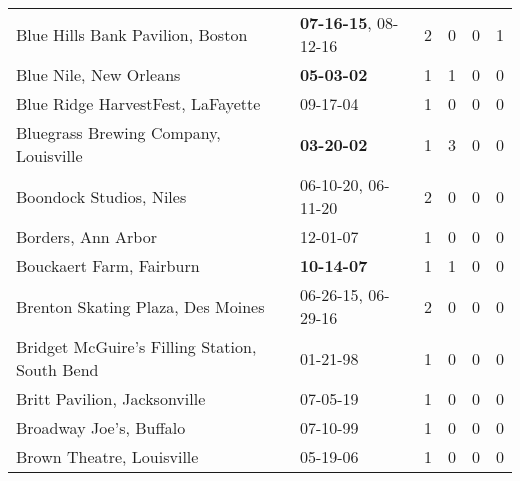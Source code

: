 \begin{longtable}{p{}p{}p{}p{}p{}p{}}
                                             Blue Hills Bank Pavilion, Boston &           \textbf{07-16-15\textsuperscript{}}, 08-12-16\textsuperscript{} &  2 &  0 &  0 &  1 \\
                                                       Blue Nile, New Orleans &                                       \textbf{05-03-02\textsuperscript{}} &  1 &  1 &  0 &  0 \\
                                            Blue Ridge HarvestFest, LaFayette &                                                09-17-04\textsuperscript{} &  1 &  0 &  0 &  0 \\
                                        Bluegrass Brewing Company, Louisville &                                       \textbf{03-20-02\textsuperscript{}} &  1 &  3 &  0 &  0 \\
                                                      Boondock Studios, Niles &                    06-10-20\textsuperscript{}, 06-11-20\textsuperscript{} &  2 &  0 &  0 &  0 \\
                                                           Borders, Ann Arbor &                                                12-01-07\textsuperscript{} &  1 &  0 &  0 &  0 \\
                                                     Bouckaert Farm, Fairburn &                                       \textbf{10-14-07\textsuperscript{}} &  1 &  1 &  0 &  0 \\
                                            Brenton Skating Plaza, Des Moines &                    06-26-15\textsuperscript{}, 06-29-16\textsuperscript{} &  2 &  0 &  0 &  0 \\
                                Bridget McGuire's Filling Station, South Bend &                                                01-21-98\textsuperscript{} &  1 &  0 &  0 &  0 \\
                                                 Britt Pavilion, Jacksonville &                                                07-05-19\textsuperscript{} &  1 &  0 &  0 &  0 \\
                                                      Broadway Joe's, Buffalo &                                                07-10-99\textsuperscript{} &  1 &  0 &  0 &  0 \\
                                                    Brown Theatre, Louisville &                                                05-19-06\textsuperscript{} &  1 &  0 &  0 &  0 \\

\end{longtable}
